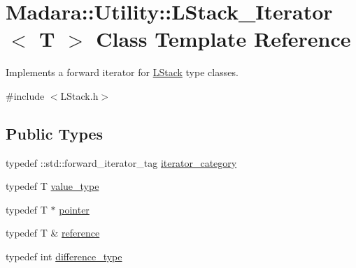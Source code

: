\hypertarget{classMadara_1_1Utility_1_1LStack__Iterator}{
\section{Madara::Utility::LStack\_\-Iterator$<$ T $>$ Class Template Reference}
\label{df/d6e/classMadara_1_1Utility_1_1LStack__Iterator}
}


Implements a forward iterator for \hyperlink{classMadara_1_1Utility_1_1LStack}{LStack} type classes.  




{\ttfamily \#include $<$LStack.h$>$}

\subsection*{Public Types}
\begin{DoxyCompactItemize}
\item 
typedef ::std::forward\_\-iterator\_\-tag \hyperlink{classMadara_1_1Utility_1_1LStack__Iterator_a7263c1420eb6766c1d2405717916aa33}{iterator\_\-category}
\item 
typedef T \hyperlink{classMadara_1_1Utility_1_1LStack__Iterator_a2634ce35c8f08e96e09320a7ebf364b8}{value\_\-type}
\item 
typedef T $\ast$ \hyperlink{classMadara_1_1Utility_1_1LStack__Iterator_af97fee752dd14c7a0f5354876b8cc15d}{pointer}
\item 
typedef T \& \hyperlink{classMadara_1_1Utility_1_1LStack__Iterator_ae3035f9385bc079744ff9790ee82c355}{reference}
\item 
typedef int \hyperlink{classMadara_1_1Utility_1_1LStack__Iterator_a739b69e25bcf2aad445e84764f69e456}{difference\_\-type}
\end{DoxyCompactItemize}
